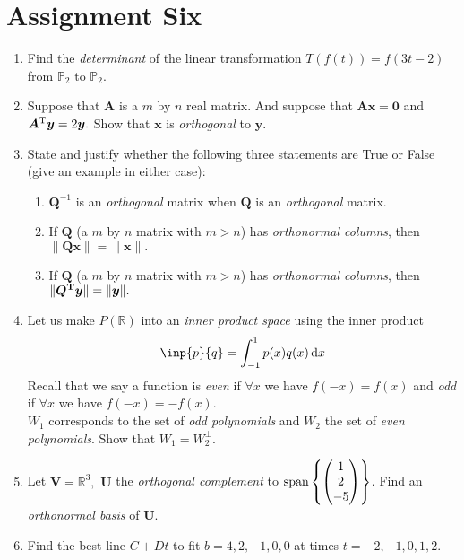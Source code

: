 \section{Assignment Six}
\begin{enumerate}
\item
Find the \textit{determinant} of the linear transformation $T(f(t))=f(3t-2)$ from $\mathbb{P}_2$ to $\mathbb{P}_2$.
\item
Suppose that $\bm A$ is a $m$ by $n$ real matrix. And suppose that $\bm{Ax}=\bm0$ and $\bm A^{\mathrm T}\bm y=2\bm y.$ Show that $\bm x$ is \textit{orthogonal} to $\bm y$.
\item
State and justify whether the following three statements are True or False (give an
example in either case):
\begin{enumerate}
\item
$\bm Q^{-1}$ is an \textit{orthogonal} matrix when $\bm Q$ is an \textit{orthogonal} matrix.
\item
If $\bm Q$ (a $m$ by $n$ matrix with $m>n$) has \textit{orthonormal columns}, then $\|\bm{Qx}\|=\|\bm x\|.$
\item
If $\bm Q$ (a $m$ by $n$ matrix with $m>n$) has \textit{orthonormal columns}, then $\|\bm{Q^{\mathrm T}\bm y}\|=\|\bm y\|.$
\end{enumerate}
\item
Let us make $P(\mathbb{R})$ into an \textit{inner product space} using the inner product
\[
\inp{p}{q}=\int_{-1}^{1}p(x)q(x)\diff x
\]
Recall that we say a function is \textit{even} if $\forall x$ we have $f(-x)=f(x)$ and \textit{odd} if $\forall x$ we have $f(-x)=-f(x).$\\
$W_1$ corresponds to the set of \textit{odd polynomials} and $W_2$ the set of \textit{even polynomials}. Show that $W_1=W_2^{\perp}.$
\item
Let $\bm V=\mathbb{R}^3,$ $\bm U$ the \textit{orthogonal complement} to $\operatorname{span}\left\{\begin{pmatrix}
1\\2\\-5
\end{pmatrix}\right\}$. Find an \textit{orthonormal basis}
of $\bm U$.
\item
Find the best line $C+Dt$ to fit $b=4,2,-1,0,0$ at times $t=-2,-1,0,1,2$.
\end{enumerate}